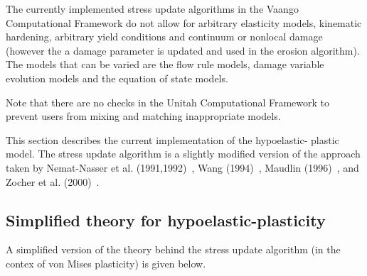 The currently implemented stress update algorithms in the Vaango
Computational Framework do not allow for arbitrary elasticity models,
kinematic hardening, arbitrary yield conditions and continuum or 
nonlocal damage (however the a damage parameter is updated and 
used in the erosion algorithm).  The models that can be varied
are the flow rule models, damage variable evolution models and the
equation of state models.

Note that there are no checks in the Unitah Computational Framework
to prevent users from mixing and matching inappropriate models.

This section describes the current implementation of the hypoelastic-
plastic model.  The stress update algorithm is a slightly modified 
version of the approach taken by 
Nemat-Nasser et al. (1991,1992)~\cite{Nemat1991,Nemat1992}, Wang (1994)~\cite{Wang1994}, 
Maudlin (1996)~\cite{Maudlin1996}, and Zocher et al. (2000)~\cite{Zocher2000}.  

\subsection{Simplified theory for hypoelastic-plasticity}
A simplified version of the theory behind the stress update algorithm
(in the contex of von Mises plasticity) is given below.

